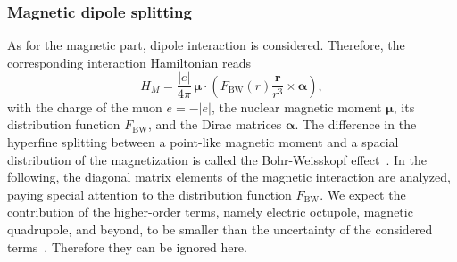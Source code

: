 \subsubsection{Magnetic dipole splitting}
\label{sec:magndip}
As for the magnetic part, dipole interaction is considered. Therefore, the corresponding interaction Hamiltonian reads~\cite{Elizarov2005}
\begin{equation}
\label{eq:Hmag}
H_{M} = \frac{|e|}{4 \pi}\,\boldsymbol{\mu}\cdot \left( F_{\text{BW}}(r) \frac{\mathbf{r}}{r^3} \times \boldsymbol{\alpha} \right),
\end{equation}
with the charge of the muon $e=-|e|$, the nuclear magnetic moment $\boldsymbol{\mu}$, its distribution function $F_{\text{BW}}$, and the Dirac matrices $\boldsymbol{\alpha}$. 
The difference in the hyperfine splitting between a point-like magnetic moment and a spacial distribution of the magnetization is called the Bohr-Weisskopf effect~\cite{bohrWeisskopf1950}. In the following, the diagonal matrix elements of the magnetic interaction are analyzed, paying special attention to the distribution function $F_{\text{BW}}$. We expect the contribution of the higher-order terms, namely electric octupole, magnetic quadrupole, and beyond, to be smaller than the uncertainty of the considered terms~\cite{Devons1995,Steffen1985}. Therefore they can be ignored here.

